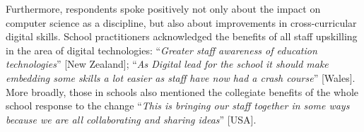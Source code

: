 \documentclass[sigconf]{acmart}
\begin{document}



Furthermore, respondents spoke positively not only about the impact on
computer science as a discipline, but also about improvements in
cross-curricular digital skills. School practitioners acknowledged the
benefits of all staff upskilling in the area of digital technologies:
``{\emph{Greater staff awareness of education technologies}}'' [New
Zealand]; ``{\emph{As Digital lead for the school it should make
embedding some skills a lot easier as staff have now had a crash
course}}'' [Wales]. More broadly, those in schools also mentioned the
collegiate benefits of the whole school response to the change
``{\emph{This is bringing our staff together in some ways because we
are all collaborating and sharing ideas}}'' [USA].
\end{document}
